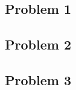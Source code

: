 \documentclass[lang=en,11pt,a4paper,citestyle =authoryear,nobib=true]{elegantpaper}
\begin{document}
\subsection{Problem 1}

\clearpage
\subsection{Problem 2}

\clearpage
\subsection{Problem 3}

\end{document}
